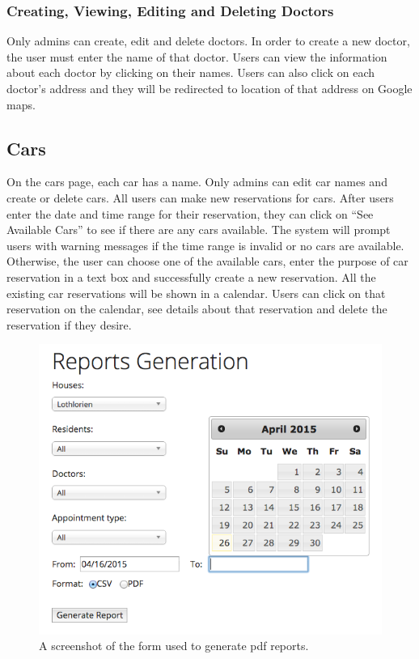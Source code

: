 \documentclass{sig-alternate}
\begin{document}
\subsubsection{Creating, Viewing, Editing and Deleting Doctors}
Only admins can create, edit and delete doctors. In order to create a new doctor, the user must enter the name of that doctor. Users can view the information about each doctor by clicking on their names. Users can also click on each doctor’s address and they will be redirected to location of that address on Google maps. 

\subsection{Cars}
On the cars page, each car has a name. Only admins can edit car names and create or delete cars. All users can make new reservations for cars. After users enter the date and time range for their reservation, they can click on “See Available Cars” to see if there are any cars available. The system will prompt users with warning messages if the time range is invalid or no cars are available. Otherwise, the user can choose one of the available cars, enter the purpose of car reservation in a text box and successfully create a new reservation. All the existing car reservations will be shown in a calendar. Users can click on that reservation on the calendar, see details about that reservation and delete the reservation if they desire. 

\begin{figure}
\includegraphics[scale=0.4]{ReportGeneration}
\caption{A screenshot of the form used to generate pdf reports.}
\end{figure}
\end{document}
